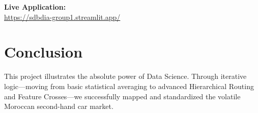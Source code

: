 \documentclass[12pt]{report}
\begin{document}
\vspace{0.5cm}
\noindent
\Large
\textbf{Live Application:} \\
\href{https://sdbdia-group1.streamlit.app/}{https://sdbdia-group1.streamlit.app/}
\normalsize
\vspace{0.5cm}

\section{Conclusion}
This project illustrates the absolute power of Data Science. Through iterative logic—moving from basic statistical averaging to advanced Hierarchical Routing and Feature Crosses—we successfully mapped and standardized the volatile Moroccan second-hand car market.
\end{document}

